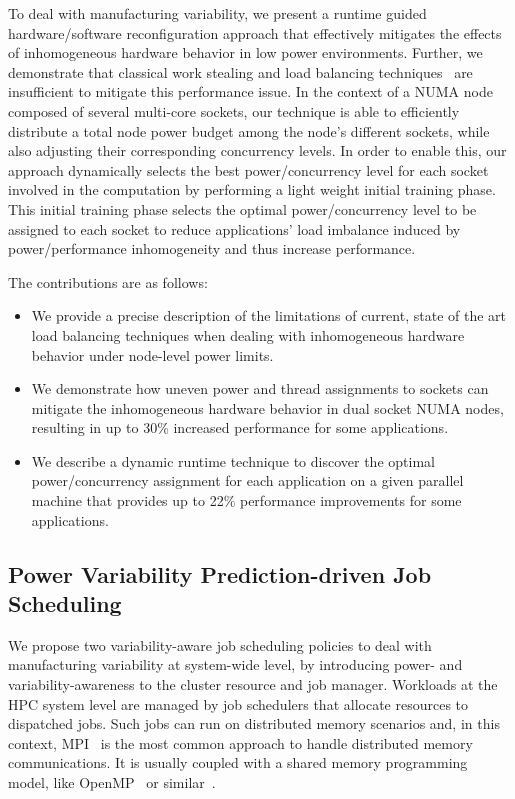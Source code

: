 To deal with manufacturing variability, we present a runtime guided hardware/software
reconfiguration approach that effectively mitigates the effects of inhomogeneous hardware
behavior in low power environments.  Further, we demonstrate that classical work stealing
and load balancing techniques~\cite{Blumofe1999, Blumofe1995, Ravichandran2011, Zheng2011}
are insufficient to mitigate this performance issue.  In the context of a NUMA node
composed of several multi-core sockets, our technique is able to efficiently distribute a
total node power budget among the node's different sockets, while also adjusting their
corresponding concurrency levels.  In order to enable this, our approach dynamically
selects the best power/concurrency level for each socket involved in the computation by
performing a light weight initial training phase.  This initial training phase selects the
optimal power/concurrency level to be assigned to each socket to reduce applications' load
imbalance induced by power/performance inhomogeneity and thus increase performance. 

The contributions are as follows:
\begin{itemize}
	\item We provide a precise description of the limitations of current, state of the art 
load balancing techniques when dealing with inhomogeneous hardware behavior under node-level 
power limits. 
  \item We demonstrate how uneven power and thread assignments to sockets can mitigate the 
inhomogeneous hardware behavior in dual socket NUMA nodes, resulting in up to 30\% increased 
performance for some applications.
	\item We describe a dynamic runtime technique to discover the optimal power/concurrency 
assignment for each application on a given parallel machine that provides up to 22\% 
performance improvements for some applications. 
\end{itemize}


\subsection{Power Variability Prediction-driven Job Scheduling}

We propose two variability-aware job scheduling policies to deal with manufacturing
variability at system-wide level, by introducing power- and variability-awareness to the
cluster resource and job manager.  Workloads at the HPC system level are managed by job
schedulers that allocate resources to dispatched jobs.  Such jobs can run on distributed
memory scenarios and, in this context, MPI~\cite{Nagle:2005:MCR:1239662.1239666} is the
most common approach to handle distributed memory communications.  It is usually coupled
with a shared memory programming model, like OpenMP~\cite{openmp13} or
similar~\cite{10.1007/978-3-540-85261-2_5}. 

